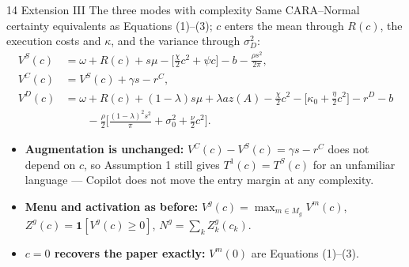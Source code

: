 \documentclass[aspectratio=169,11pt]{beamer}
\newcommand{\ind}{\mathbf 1}
\begin{document}
\begin{frame}{14 \textperiodcentered{} Extension III \textperiodcentered{} The three modes with complexity}
  \footnotesize
  Same CARA--Normal certainty equivalents as Equations (1)--(3); $c$ enters the mean through $R(c)$, the
  execution costs and $\kappa$, and the variance through $\sigma_D^2$:
  \begin{align*}
    V^S(c) &= \omega + R(c) + s\mu - \Big[\tfrac{\chi}{2}c^2+\psi c\Big] - b - \tfrac{\rho s^2}{2\pi},\\
    V^C(c) &= V^S(c) + \gamma s - r^C,\\
    V^D(c) &= \omega + R(c) + (1-\lambda)s\mu + \lambda a z(A) - \tfrac{\chi}{2}c^2
             - \Big[\kappa_0 + \tfrac{\eta}{2}c^2\Big] - r^D - b\\
           &\qquad - \tfrac{\rho}{2}\Big[\tfrac{(1-\lambda)^2 s^2}{\pi} + \sigma_0^2 + \tfrac{\nu}{2}c^2\Big].
  \end{align*}
  \begin{itemize}
    \item \textbf{Augmentation is unchanged:} $V^C(c)-V^S(c)=\gamma s-r^C$ does not depend on $c$, so
      Assumption 1 still gives $T^1(c)=T^S(c)$ for an unfamiliar language --- Copilot does not move the
      entry margin at any complexity.
    \item \textbf{Menu and activation as before:} $V^g(c)=\max_{m\in M_g}V^m(c)$, $Z^g(c)=\ind[V^g(c)\ge 0]$,
      $N^g=\sum_k Z^g_k(c_k)$.
    \item \textbf{$c=0$ recovers the paper exactly:} $V^m(0)$ are Equations (1)--(3).
  \end{itemize}
\end{frame}
\end{document}
